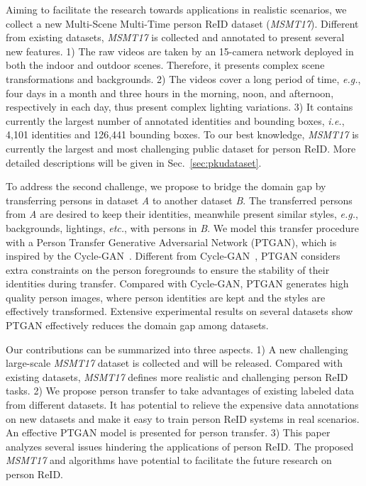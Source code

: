 \documentclass[10pt,twocolumn,letterpaper]{article}
\begin{document}
Aiming to facilitate the research towards applications in realistic scenarios, we collect a new Multi-Scene Multi-Time person ReID dataset (\emph{MSMT17}). Different from existing datasets, \emph{MSMT17} is collected and annotated to present several new features. 1) The raw videos are taken by an 15-camera network deployed in both the indoor and outdoor scenes. Therefore, it presents complex scene transformations and backgrounds. 2) The videos cover a long period of time, \emph{e.g.}, four days in a month and three hours in the morning, noon, and afternoon, respectively in each day, thus present complex lighting variations. 3) It contains currently the largest number of annotated identities and bounding boxes, \emph{i.e.}, 4,101 identities and 126,441 bounding boxes. To our best knowledge, \emph{MSMT17} is currently the largest and most challenging public dataset for person ReID. More detailed descriptions will be given in Sec.~\ref{sec:pkudataset}.

To address the second challenge, we propose to bridge the domain gap by transferring persons in dataset \emph{A} to another dataset \emph{B}. The transferred persons from \emph{A} are desired to keep their identities, meanwhile present similar styles, \emph{e.g.}, backgrounds, lightings, \emph{etc.}, with persons in \emph{B}. We model this transfer procedure with a Person Transfer Generative Adversarial Network (PTGAN), which is inspired by the Cycle-GAN~\cite{zhu2017unpaired}. Different from Cycle-GAN~\cite{zhu2017unpaired}, PTGAN considers extra constraints on the person foregrounds to ensure the stability of their identities during transfer. Compared with Cycle-GAN, PTGAN generates high quality person images, where person identities are kept and the styles are effectively transformed. Extensive experimental results on several datasets show PTGAN effectively reduces the domain gap among datasets.

Our contributions can be summarized into three aspects. 1) A new challenging large-scale \emph{MSMT17} dataset is collected and will be released. Compared with existing datasets, \emph{MSMT17} defines more realistic and challenging person ReID tasks. 2) We propose person transfer to take advantages of existing labeled data from different datasets. It has potential to relieve the expensive data annotations on new datasets and make it easy to train person ReID systems in real scenarios. An effective PTGAN model is presented for person transfer. 3) This paper analyzes several issues hindering the applications of person ReID. The proposed \emph{MSMT17} and algorithms have potential to facilitate the future research on person ReID.
\end{document}
